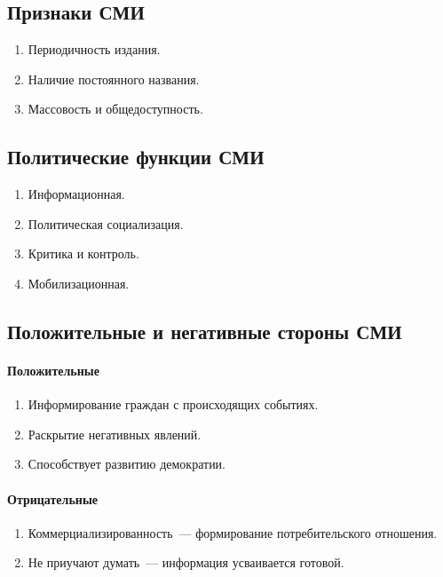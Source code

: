 \documentclass[12pt]{article}
\begin{document}
	\subsection{Признаки СМИ}
	\begin{enumerate}
		\item Периодичность издания.
		\item Наличие постоянного названия.
		\item Массовость и общедоступность.
	\end{enumerate}
	
	\subsection{Политические функции СМИ}
	\begin{enumerate}
		\item Информационная.
		\item Политическая социализация.
		\item Критика и контроль.
		\item Мобилизационная.
	\end{enumerate}
	
	\subsection{Положительные и негативные стороны СМИ}
	
	\paragraph{Положительные}
	
	\begin{enumerate}
		\item Информирование граждан с происходящих событиях.
		\item Раскрытие негативных явлений.
		\item Способствует развитию демократии.
	\end{enumerate}
	
	\paragraph{Отрицательные}
	
	\begin{enumerate}
		\item Коммерциализированность~--- формирование потребительского отношения.
		\item Не приучают думать~--- информация усваивается готовой.
	\end{enumerate}
	
\end{document}

